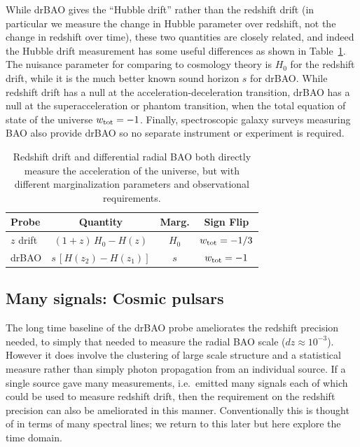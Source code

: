 \documentclass[preprint2, 10pt]{aastex}
\begin{document}
While drBAO gives the ``Hubble drift'' rather than the redshift drift 
(in particular we measure the change in Hubble parameter over redshift, 
not the change in redshift over time), these two quantities are 
closely related, and indeed the Hubble drift measurement has some 
useful differences as shown in Table~\ref{tab:drbao}.  The nuisance 
parameter for comparing to cosmology theory is $H_0$ for the redshift 
drift, while it is the much better known sound horizon $s$ for drBAO.  
While redshift drift has a null at the acceleration-deceleration transition, 
drBAO has a null at the superacceleration or phantom transition, when the 
total equation of state of the universe $w_{\rm tot}=-1$.  Finally, 
spectroscopic galaxy surveys measuring BAO also provide drBAO so no 
separate instrument or experiment is required. 


\begin{table}[!htb]
\small 
\begin{tabular}{l|ccc} 
Probe  &  Quantity  & Marg. & Sign Flip\\ 
\hline 
$z$ drift &$(1+z)\,H_0-H(z)$ & $H_0$ & $w_{\rm tot}=-1/3$ \\ 
drBAO & $s\,[H(z_2)-H(z_1)]$ & $s$ & $w_{\rm tot}=-1$ \\ 
\end{tabular} 
\caption{Redshift drift and differential radial BAO both 
directly measure the acceleration of the universe, but with different 
marginalization parameters and observational requirements. 
} 
\label{tab:drbao} 
\end{table} 
\subsection{Many signals: Cosmic pulsars} 

The long time baseline of the drBAO probe ameliorates the redshift 
precision needed, to simply that needed to measure the radial BAO scale 
($dz\approx10^{-3}$).  However it does involve the clustering of large scale 
structure and a statistical measure rather than simply photon propagation 
from an individual source.  If a single source gave many measurements, 
i.e.\ emitted many signals each of which could be used to measure redshift 
drift, then the requirement on the redshift precision can also be 
ameliorated in this manner.  
Conventionally this is thought of in terms of many spectral lines; we 
return to this later but here explore the time domain. 
\end{document}
